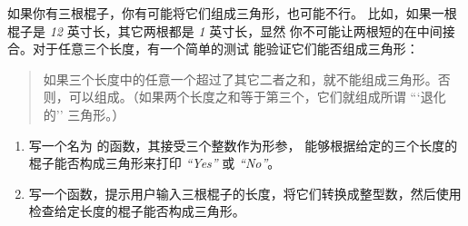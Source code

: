 {{{{\begin{exercise}
\end{exercise}


\begin{exercise}


如果你有三根棍子，你有可能将它们组成三角形，也可能不行。
比如，如果一根棍子是 {\em 12} 英寸长，其它两根都是 {\em 1} 英寸长，显然
你不可能让两根短的在中间接合。对于任意三个长度，有一个简单的测试
能验证它们能否组成三角形：


\begin{quotation}
如果三个长度中的任意一个超过了其它二者之和，就不能组成三角形。否则，可以组成。（如果两个长度之和等于第三个，它们就组成所谓 ```退化的'' 三角形。）
\end{quotation}

\begin{enumerate}


\item 写一个名为 {\em {}} 的函数，其接受三个整数作为形参，
   能够根据给定的三个长度的棍子能否构成三角形来打印 {\em ``Yes''} 或 {\em ``No''}。


\item 写一个函数，提示用户输入三根棍子的长度，将它们转换成整型数，然后使用
   {\em {}} 检查给定长度的棍子能否构成三角形。


\end{enumerate}
\end{exercise}}}}}

